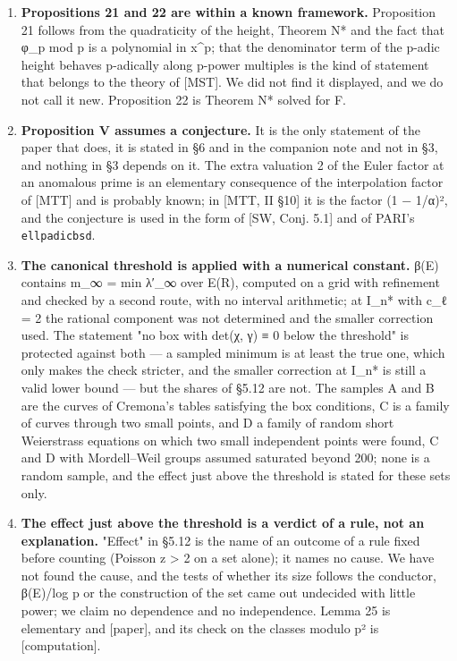 \documentclass[11pt,a4paper]{article}
\theoremstyle{named}
\begin{document}
\begin{enumerate}[leftmargin=1.4em,itemsep=.2em,topsep=.3em]
\item \textbf{Propositions 21 and 22 are within a known framework.} Proposition 21 follows from the quadraticity of the height, Theorem N* and the fact that φ\_p mod p is a polynomial in x\textasciicircum{}p; that the denominator term of the p-adic height behaves p-adically along p-power multiples is the kind of statement that belongs to the theory of [MST]. We did not find it displayed, and we do not call it new. Proposition 22 is Theorem N* solved for F.
\item \textbf{Proposition V assumes a conjecture.} It is the only statement of the paper that does, it is stated in §6 and in the companion note and not in §3, and nothing in §3 depends on it. The extra valuation 2 of the Euler factor at an anomalous prime is an elementary consequence of the interpolation factor of [MTT] and is probably known; in [MTT, II §10] it is the factor (1 − 1/α)², and the conjecture is used in the form of [SW, Conj. 5.1] and of PARI's \texttt{ellpadicbsd}.
\item \textbf{The canonical threshold is applied with a numerical constant.} β(E) contains m\_∞ = min λ′\_∞ over E(R), computed on a grid with refinement and checked by a second route, with no interval arithmetic; at I\_n* with c\_ℓ = 2 the rational component was not determined and the smaller correction used. The statement "no box with det(χ, γ) ≡ 0 below the threshold" is protected against both — a sampled minimum is at least the true one, which only makes the check stricter, and the smaller correction at I\_n* is still a valid lower bound — but the shares of §5.12 are not. The samples A and B are the curves of Cremona's tables satisfying the box conditions, C is a family of curves through two small points, and D a family of random short Weierstrass equations on which two small independent points were found, C and D with Mordell–Weil groups assumed saturated beyond 200; none is a random sample, and the effect just above the threshold is stated for these sets only.
\item \textbf{The effect just above the threshold is a verdict of a rule, not an explanation.} "Effect" in §5.12 is the name of an outcome of a rule fixed before counting (Poisson z \textgreater{} 2 on a set alone); it names no cause. We have not found the cause, and the tests of whether its size follows the conductor, β(E)/log p or the construction of the set came out undecided with little power; we claim no dependence and no independence. Lemma 25 is elementary and [paper], and its check on the classes modulo p² is [computation].
\end{enumerate}
\end{document}
